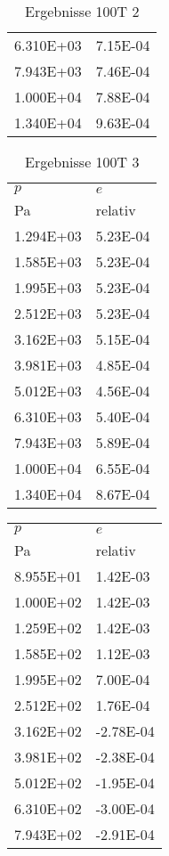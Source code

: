 \begin{table}
\begin{tabular}{l l }
\num{6.310E+03}&\num{7.15E-04}\\
\num{7.943E+03}&\num{7.46E-04}\\
\num{1.000E+04}&\num{7.88E-04}\\
\num{1.340E+04}&\num{9.63E-04}\\
\bottomrule
\end{tabular}\caption{Ergebnisse 100T 2}\end{table}\begin{table}\begin{tabular}{l l }
\toprule
$p$&$e$\\
 Pa & relativ \\\midrule
\num{1.294E+03}&\num{5.23E-04}\\
\num{1.585E+03}&\num{5.23E-04}\\
\num{1.995E+03}&\num{5.23E-04}\\
\num{2.512E+03}&\num{5.23E-04}\\
\num{3.162E+03}&\num{5.15E-04}\\
\num{3.981E+03}&\num{4.85E-04}\\
\num{5.012E+03}&\num{4.56E-04}\\
\num{6.310E+03}&\num{5.40E-04}\\
\num{7.943E+03}&\num{5.89E-04}\\
\num{1.000E+04}&\num{6.55E-04}\\
\num{1.340E+04}&\num{8.67E-04}\\
\bottomrule
\end{tabular}\caption{Ergebnisse 100T 3}\end{table}\begin{table}\begin{tabular}{l l }
\toprule
$p$&$e$\\
 Pa & relativ \\\midrule
\num{8.955E+01}&\num{1.42E-03}\\
\num{1.000E+02}&\num{1.42E-03}\\
\num{1.259E+02}&\num{1.42E-03}\\
\num{1.585E+02}&\num{1.12E-03}\\
\num{1.995E+02}&\num{7.00E-04}\\
\num{2.512E+02}&\num{1.76E-04}\\
\num{3.162E+02}&\num{-2.78E-04}\\
\num{3.981E+02}&\num{-2.38E-04}\\
\num{5.012E+02}&\num{-1.95E-04}\\
\num{6.310E+02}&\num{-3.00E-04}\\
\num{7.943E+02}&\num{-2.91E-04}\\

\end{tabular}
\end{table}
